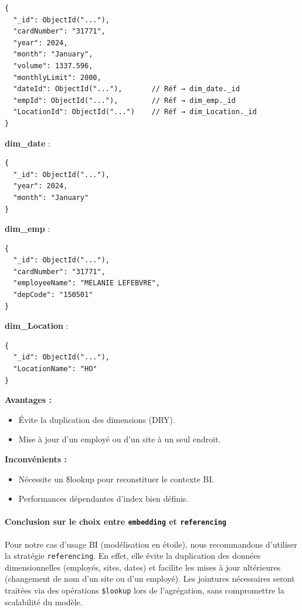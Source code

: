 \documentclass[a4paper,11pt]{report}
\begin{document}
\vspace{0.5em}
\begin{tcolorbox}[colback=blue!5!white,colframe=blue!40!black,title={\texttt{referencing} : dimensions séparées}]
  \begin{verbatim}
{
  "_id": ObjectId("..."),
  "cardNumber": "31771",
  "year": 2024,
  "month": "January",
  "volume": 1337.596,
  "monthlyLimit": 2000,
  "dateId": ObjectId("..."),       // Réf → dim_date._id
  "empId": ObjectId("..."),        // Réf → dim_emp._id
  "LocationId": ObjectId("...")    // Réf → dim_Location._id
}
  \end{verbatim}

  \textbf{dim\_date} :
  \begin{verbatim}
{
  "_id": ObjectId("..."),
  "year": 2024,
  "month": "January"
}
  \end{verbatim}

  \textbf{dim\_emp} :
  \begin{verbatim}
{
  "_id": ObjectId("..."),
  "cardNumber": "31771",
  "employeeName": "MELANIE LEFEBVRE",
  "depCode": "150501"
}
  \end{verbatim}

  \textbf{dim\_Location} :
  \begin{verbatim}
{
  "_id": ObjectId("..."),
  "LocationName": "HO"
}
  \end{verbatim}

  \textbf{Avantages :}
  \begin{itemize}[leftmargin=1.2em]
    \item Évite la duplication des dimensions (DRY).  
    \item Mise à jour d’un employé ou d’un site à un seul endroit.  
  \end{itemize}

  \textbf{Inconvénients :}
  \begin{itemize}[leftmargin=1.2em]
    \item Nécessite un \$lookup pour reconstituer le contexte BI.  
    \item Performances dépendantes d’index bien définis.  
  \end{itemize}
\end{tcolorbox}

\paragraph{Conclusion sur le choix entre \texttt{embedding} et \texttt{referencing}\\}  
Pour notre cas d’usage BI (modélisation en étoile), nous recommandons d’utiliser la stratégie \texttt{referencing}. En effet, elle évite la duplication des données dimensionnelles (employés, sites, dates) et facilite les mises à jour ultérieures (changement de nom d’un site ou d’un employé). Les jointures nécessaires seront traitées via des opérations \texttt{\$lookup} lors de l’agrégation, sans compromettre la scalabilité du modèle.
\vspace{0.5em}
\end{document}
